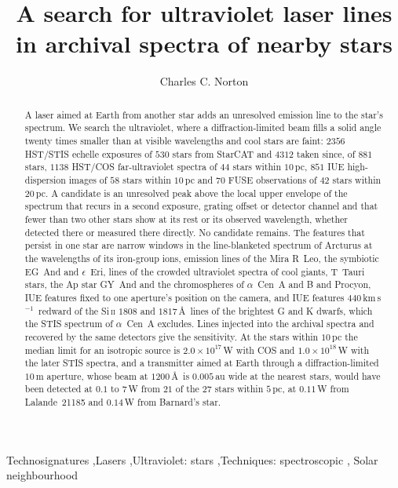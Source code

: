 \documentclass[3p,11pt]{elsarticle}
\newcommand{\kms}{km\,s$^{-1}$}
\newcommand{\sci}[2]{#1\times10^{#2}}
\newcommand{\ion}[2]{#1\,\textsc{#2}}
\begin{document}
\begin{frontmatter}

\title{A search for ultraviolet laser lines in archival spectra of nearby stars}

\author{Charles C. Norton}

\begin{abstract}
A laser aimed at Earth from another star adds an unresolved emission line to the
star's spectrum. We search the ultraviolet, where a diffraction-limited beam fills a
solid angle twenty times smaller than at visible wavelengths and cool stars are faint: $2356$ HST/STIS
echelle exposures of $530$ stars from StarCAT and $4312$ taken since, of $881$ stars,
$1138$ HST/COS far-ultraviolet spectra of $44$ stars within $10$\,pc, $851$ IUE
high-dispersion images of $58$ stars within $10$\,pc and $70$ FUSE observations of $42$
stars within $20$\,pc. A candidate is an
unresolved peak above the local upper envelope of the spectrum that recurs in a second
exposure, grating offset or detector channel and that fewer than two other stars show at
its rest or its observed wavelength, whether detected there or measured there directly.
No candidate remains. The features that persist in one star are narrow windows in the
line-blanketed spectrum of Arcturus at the wavelengths of its iron-group ions, emission
lines of the Mira R~Leo, the symbiotic EG~And and $\epsilon$~Eri,
lines of the crowded ultraviolet spectra of cool giants, T~Tauri stars, the Ap star
GY~And and the chromospheres of $\alpha$~Cen~A and B and Procyon, IUE features fixed to
one aperture's position on the camera, and IUE features
$440$\,\kms\ redward of the \ion{Si}{ii} $1808$ and $1817$\,\AA\ lines of the brightest
G and K dwarfs, which the STIS spectrum of $\alpha$~Cen~A excludes. Lines injected into
the archival spectra and recovered by the same detectors give the sensitivity. At the
stars within $10$\,pc the median limit for an isotropic source is $\sci{2.0}{17}$\,W
with COS and $\sci{1.0}{18}$\,W with the later STIS spectra, and a transmitter aimed at
Earth through a diffraction-limited $10$\,m aperture, whose beam at $1200$\,\AA\ is
$0.005$\,au wide at the nearest stars, would have been detected at $0.1$
to $7$\,W from $21$ of the $27$ stars within $5$\,pc, at $0.11$\,W from Lalande~21185
and $0.14$\,W from Barnard's star.
\end{abstract}

\begin{keyword}
Technosignatures \sep Lasers \sep Ultraviolet: stars \sep Techniques: spectroscopic \sep
Solar neighbourhood
\end{keyword}

\end{frontmatter}
\end{document}
